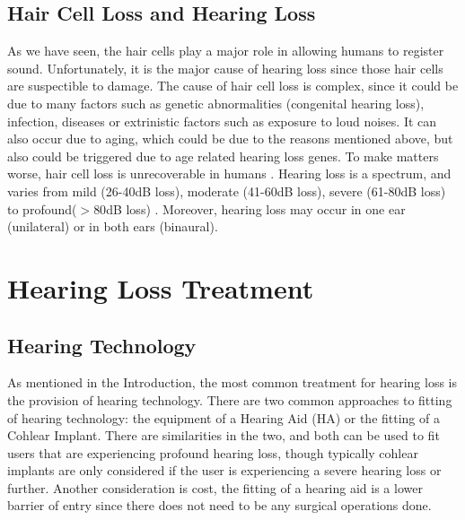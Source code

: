 \documentclass[logo,bsc,singlespacing,parskip,online]{infthesis}
\begin{document}
\newpage

\subsection{Hair Cell Loss and Hearing Loss}
As we have seen, the hair cells play a major role in allowing humans to register sound. Unfortunately,
it is the major cause of hearing loss since those hair cells are suspectible to damage.
The cause of hair cell loss is complex, since it could be due to many factors such as 
genetic abnormalities (congenital hearing loss), infection, diseases or extrinistic factors such as exposure to loud noises.
It can also occur due to aging, which could be due to the reasons mentioned above, but also 
could be triggered due to age related hearing loss genes. To make matters worse, hair cell loss is unrecoverable in humans \cite{Furness2015HairCell}.
Hearing loss is a spectrum, and varies from mild (26-40dB loss), moderate (41-60dB loss), severe (61-80dB loss) to profound($>80$dB loss) \cite{Nieman2020HearingLoss}.
Moreover, hearing loss may occur in one ear (unilateral) or in both ears (binaural). 

\section{Hearing Loss Treatment}
\subsection{Hearing Technology}
As mentioned in the Introduction, the most common treatment for hearing loss 
is the provision of hearing technology. There are two common approaches 
to fitting of hearing technology: the equipment of a Hearing Aid (HA) 
or the fitting of a Cohlear Implant. There are similarities in the 
two, and both can be used to fit users that are experiencing profound hearing loss, 
though typically cohlear implants are only considered if the user is experiencing 
a severe hearing loss or further. Another consideration is cost,
the fitting of a hearing aid is a lower barrier of entry since there 
does not need to be any surgical operations done. 
\end{document}
